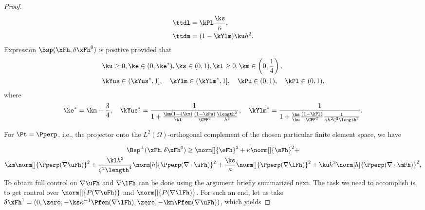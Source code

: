 \begin{proof}
\begin{align*}
    \ttdl &= \kPl\frac{\ks}{\kappa},\\
    \ttdm &= (1-\kYlm)\ku h^2.\\
\end{align*}
Expression $\Bsp(\xFh,\delta\xFh^0)$ is positive provided that
\begin{align*}
& \ku \geq 0, \ke\in(0,\ke^*),\ks\in(0, 1),\kl\geq 0,\km\in\left(0,\frac14\right),\\
& \kYus\in(\kYus^*,1], \quad \kYlm\in(\kYlm^*,1],\quad \kPu\in(0,1),\quad \kPl\in(0,1),
\end{align*}
where
$$
\ke^* = \km+\frac34,\quad
\kYus^* = \frac{1}{1+\frac{\km(1-4\km)}{\kl}\frac{(1-\kPu)}{\CPF^2}\frac{\length^2}{h^2}},\quad
\kYlm^* = \frac{1}{1+\frac{\ks}{\ku}\frac{(1-\kPl)}{\CPF^2}\frac{1}{\kappa h^2\zeta^2\length^2}}.
$$

For $\Pt = \Pperp$, i.e., the projector onto the $L^2(\Omega)$-orthogonal complement of the chosen particular finite element space, we have

\begin{multline*}
\Bsp^\perp(\xFh,\delta\xFh^0) \geq 
    \norm[]{\eFh}^2+
    \kappa\norm[]{\sFh}^2+\\
    \km\norm[]{\Pperp(\nabla\uFh)}^2+
    \frac{\kl h^2}{\zeta^2\length^4}\norm[h]{\Pperp(\nabla\cdot\sFh)}^2+ 
    \frac{\ks}{\kappa}\norm[]{\Pperp(\nabla\lFh)}^2+
    \ku h^2\norm[h]{\Pperp(\nabla\cdot\mFh)}^2,
\end{multline*}
To obtain full control on $\nabla\uFh$ and $\nabla\lFh$ can be done using the argument briefly summarized next. The task we need to accomplish is to get control over $\norm[]{P(\nabla\uFh)}$ and $\norm[]{P(\nabla\lFh)}$. For such an end, let us take $\delta\xFh^1 = (0,\zero,-\ks\kappa^{-1}\Pfem(\nabla\lFh),\zero,-\km\Pfem(\nabla\uFh))$, which yields 

\end{proof}
